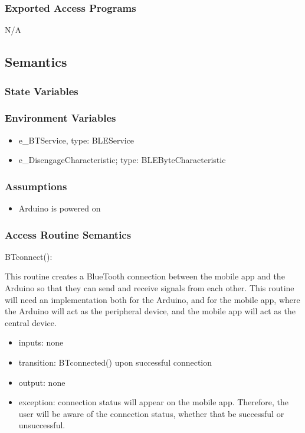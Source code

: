 \documentclass[12pt, titlepage]{article}
\begin{document}
\subsubsection{Exported Access Programs}

N/A

\subsection{Semantics}

\subsubsection{State Variables}


\subsubsection{Environment Variables}

\begin{itemize}
\item e\_BTService, type: BLEService
\item e\_DisengageCharacteristic; type: BLEByteCharacteristic
\end{itemize}

\subsubsection{Assumptions}

\begin{itemize}
\item Arduino is powered on
\end{itemize}

\subsubsection{Access Routine Semantics}

\noindent BTconnect():

This routine creates a BlueTooth connection between the mobile app and the Arduino so that they can send and receive signals from each other. This routine will need an implementation both for the Arduino, and for the mobile app, where the Arduino will act as the peripheral device, and the mobile app will act as the central device. 

\begin{itemize}
\item inputs: none
\item transition: BTconnected() upon successful connection
\item output: none
\item exception: connection status will appear on the mobile app. Therefore, the user will be aware of the connection status, whether that be successful or unsuccessful. 
\end{itemize}
\end{document}
